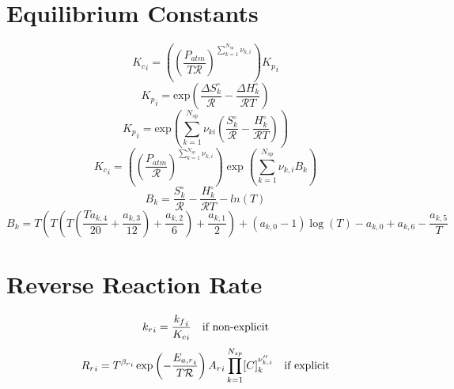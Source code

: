 \documentclass[a4paper,10pt]{article}
\newcommand{\ns}{N_{sp}}
\newcommand{\Ru}{\mathcal{R}}
\begin{document}
\section{Equilibrium Constants}
\begin{dmath} {K_c}_{i} = \left(\left(\frac{P_{atm}}{T \Ru}\right)^{\sum_{k=1}^{\ns} \nu_{k,i}}\right) {K_p}_{i}\end{dmath} 
\begin{dmath} {K_p}_{i} = \text{exp}(\frac{\Delta S^{\circ}_k}{\Ru} - \frac{\Delta H^{\circ}_k}{\Ru T})\end{dmath} 
\begin{dmath} {K_p}_{i} = \text{exp}\left(\sum_{k=1}^{\ns}\nu_{ki}\left(\frac{S^{\circ}_k}{\Ru} - \frac{H^{\circ}_k}{\Ru T}\right)\right)\end{dmath} 
\begin{dmath} {K_c}_{i} = \left(\left(\frac{P_{atm}}{\Ru}\right)^{\sum_{k=1}^{\ns} \nu_{k,i}}\right) \operatorname{exp}\left({\sum_{k=1}^{\ns} \nu_{k,i} B_{k}}\right)\end{dmath} 
\begin{dmath} B_{k}= \frac{S^{\circ}_k}{\Ru} - \frac{H^{\circ}_k}{\Ru T} - ln(T)\end{dmath} 
\begin{dmath} B_{k} = T \left(T \left(T \left(\frac{T a_{k,4}}{20} + \frac{a_{k,3}}{12}\right) + \frac{a_{k,2}}{6}\right) + \frac{a_{k,1}}{2}\right) + \left(a_{k,0} - 1\right) \log{\left (T \right )} - a_{k,0} + a_{k,6} - \frac{a_{k,5}}{T}\end{dmath} 
\section{Reverse Reaction Rate}
\begin{dmath} {k_r}_{i}=\frac{{k_f}_{i}}{{K_c}_{i}}\text{\quad if non-explicit}\end{dmath} 
\begin{dmath} {R_r}_{i}=T^{{\beta_r}_{i}} \operatorname{exp}\left({- \frac{{E_{a,r}}_{i}}{T \Ru}}\right) {A_{r}}_{i} \prod_{k=1}^{\ns} [C]_{k}^{\nu^{\prime\prime}_{k,i}}\text{\quad if explicit}\end{dmath} 
\end{document}
